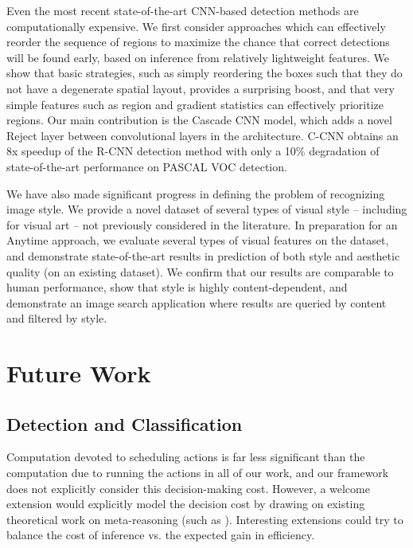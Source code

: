 Even the most recent state-of-the-art CNN-based detection methods are computationally expensive.
We first consider approaches which can effectively reorder the sequence of regions to maximize the chance that correct detections will be found early, based on inference from relatively lightweight features.
We show that basic strategies, such as simply reordering the boxes such that they do not have a degenerate spatial layout, provides a surprising boost, and that very simple features such as region and gradient statistics can effectively prioritize regions.
Our main contribution is the Cascade CNN model, which adds a novel Reject layer between convolutional layers in the architecture.
C-CNN obtains an 8x speedup of the R-CNN detection method with only a 10\% degradation of state-of-the-art performance on PASCAL VOC detection.

We have also made significant progress in defining the problem of recognizing image style.
We provide a novel dataset of several types of visual style -- including for visual art -- not previously considered in the literature.
In preparation for an Anytime approach, we evaluate several types of visual features on the dataset, and demonstrate state-of-the-art results in prediction of both style and aesthetic quality (on an existing dataset).
We confirm that our results are comparable to human performance, show that style is highly content-dependent, and demonstrate an image search application where results are queried by content and filtered by style.

\section{Future Work}

\subsection{Detection and Classification}

Computation devoted to scheduling actions is far less significant than the computation due to running the actions in all of our work, and our framework does not explicitly consider this decision-making cost.
However, a welcome extension would explicitly model the decision cost by drawing on existing theoretical work on meta-reasoning (such as \cite{Hay2012}).
Interesting extensions could try to balance the cost of inference vs. the expected gain in efficiency.

